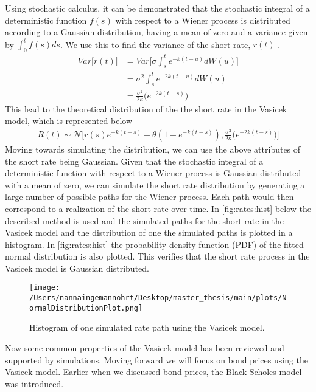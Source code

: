 Using stochastic calculus, it can be demonstrated that the stochastic integral of a deterministic function 
$f(s)$ with respect to a Wiener process is distributed according to a Gaussian distribution,
having a mean of zero and a variance given by $\int_0^t f(s) ds$. We use this to find the variance of the short rate,
$r(t)$ \cite{Bjork}.
\begin{align*}
    Var\Big[r(t)\Big] &= Var\Big[\sigma \int_{s}^{t}e^{-k(t-u)} d W(u) \Big] \\
    &= \sigma^2 \int_{s}^{t}e^{-2k(t-u)} d W(u) \\
    &= \frac{\sigma^2}{2\kappa} \Big(e^{-2k(t-s)}\Big)
    \end{align*}
This lead to the theoretical distribution of the the short rate in the Vasicek model, which is represented below
\begin{align}
    R(t) \sim \mathcal{N} \Big[ r(s) e^{-k(t-s)} + \theta \left( 1 - e^{-k(t-s)} \right) ,
    \frac{\sigma^2}{2\kappa} \Big(e^{-2k(t-s)}\Big) \Big]
\end{align}
Moving towards simulating the distribution, we can use the above attributes of the short rate being Gaussian.
Given that the stochastic integral of a deterministic function with respect to a Wiener process is Gaussian distributed
with a mean of zero, we can simulate the short rate distribution by generating a large number of possible paths
for the Wiener process. Each path would then correspond to a realization of the short rate over time. In \autoref{fig:rates:hist}
below the described method is used and the simulated paths for the short rate in the Vasicek model and the distribution of one  the
simulated paths is plotted in a histogram. In \autoref{fig:rates:hist} the probability density function (PDF) of the 
fitted normal distribution is also plotted. This verifies that the short rate process in the Vasicek model is Gaussian distributed.
\begin{figure}[H]
    \centering
    \texttt{[image: /Users/nannaingemannohrt/Desktop/master\_thesis/main/plots/NormalDistributionPlot.png]}
    \caption{Histogram of one simulated rate path using the Vasicek model.}
    \label{fig:rates:hist}
\end{figure}
\noindent
Now some common properties of the Vasicek model has been reviewed and supported by simulations. Moving forward we will 
focus on bond prices using the Vasicek model. Earlier when we discussed bond prices, the Black Scholes model was introduced. 
\\\\
